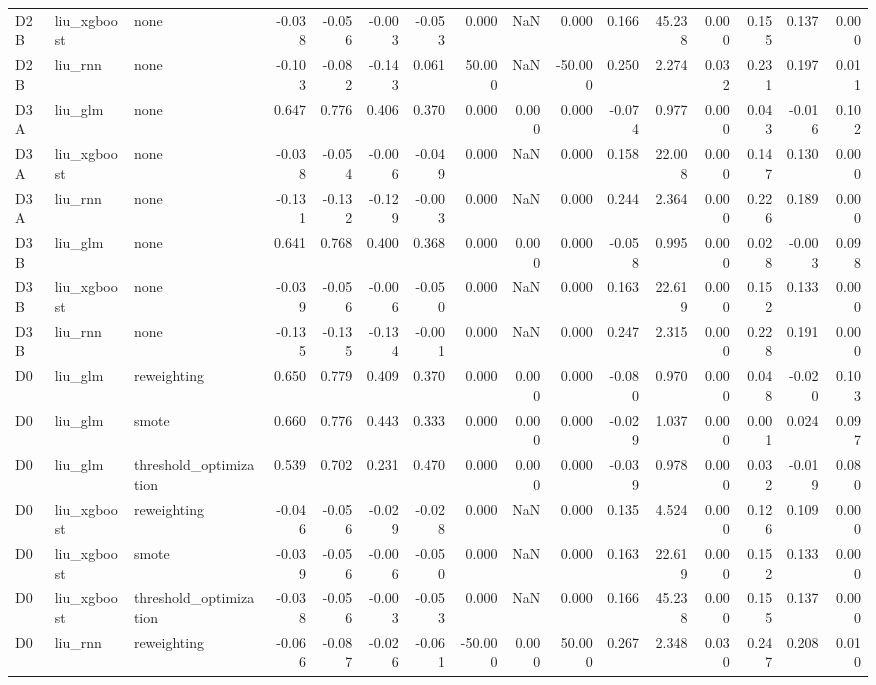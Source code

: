 \begin{tabular}{lllrrrrrrrrrrrrr}
D2B & liu_xgboost & none & -0.038 & -0.056 & -0.003 & -0.053 & 0.000 & NaN & 0.000 & 0.166 & 45.238 & 0.000 & 0.155 & 0.137 & 0.000 \\
D2B & liu_rnn & none & -0.103 & -0.082 & -0.143 & 0.061 & 50.000 & NaN & -50.000 & 0.250 & 2.274 & 0.032 & 0.231 & 0.197 & 0.011 \\
D3A & liu_glm & none & 0.647 & 0.776 & 0.406 & 0.370 & 0.000 & 0.000 & 0.000 & -0.074 & 0.977 & 0.000 & 0.043 & -0.016 & 0.102 \\
D3A & liu_xgboost & none & -0.038 & -0.054 & -0.006 & -0.049 & 0.000 & NaN & 0.000 & 0.158 & 22.008 & 0.000 & 0.147 & 0.130 & 0.000 \\
D3A & liu_rnn & none & -0.131 & -0.132 & -0.129 & -0.003 & 0.000 & NaN & 0.000 & 0.244 & 2.364 & 0.000 & 0.226 & 0.189 & 0.000 \\
D3B & liu_glm & none & 0.641 & 0.768 & 0.400 & 0.368 & 0.000 & 0.000 & 0.000 & -0.058 & 0.995 & 0.000 & 0.028 & -0.003 & 0.098 \\
D3B & liu_xgboost & none & -0.039 & -0.056 & -0.006 & -0.050 & 0.000 & NaN & 0.000 & 0.163 & 22.619 & 0.000 & 0.152 & 0.133 & 0.000 \\
D3B & liu_rnn & none & -0.135 & -0.135 & -0.134 & -0.001 & 0.000 & NaN & 0.000 & 0.247 & 2.315 & 0.000 & 0.228 & 0.191 & 0.000 \\
D0 & liu_glm & reweighting & 0.650 & 0.779 & 0.409 & 0.370 & 0.000 & 0.000 & 0.000 & -0.080 & 0.970 & 0.000 & 0.048 & -0.020 & 0.103 \\
D0 & liu_glm & smote & 0.660 & 0.776 & 0.443 & 0.333 & 0.000 & 0.000 & 0.000 & -0.029 & 1.037 & 0.000 & 0.001 & 0.024 & 0.097 \\
D0 & liu_glm & threshold_optimization & 0.539 & 0.702 & 0.231 & 0.470 & 0.000 & 0.000 & 0.000 & -0.039 & 0.978 & 0.000 & 0.032 & -0.019 & 0.080 \\
D0 & liu_xgboost & reweighting & -0.046 & -0.056 & -0.029 & -0.028 & 0.000 & NaN & 0.000 & 0.135 & 4.524 & 0.000 & 0.126 & 0.109 & 0.000 \\
D0 & liu_xgboost & smote & -0.039 & -0.056 & -0.006 & -0.050 & 0.000 & NaN & 0.000 & 0.163 & 22.619 & 0.000 & 0.152 & 0.133 & 0.000 \\
D0 & liu_xgboost & threshold_optimization & -0.038 & -0.056 & -0.003 & -0.053 & 0.000 & NaN & 0.000 & 0.166 & 45.238 & 0.000 & 0.155 & 0.137 & 0.000 \\
D0 & liu_rnn & reweighting & -0.066 & -0.087 & -0.026 & -0.061 & -50.000 & 0.000 & 50.000 & 0.267 & 2.348 & 0.030 & 0.247 & 0.208 & 0.010 \\

\end{tabular}
